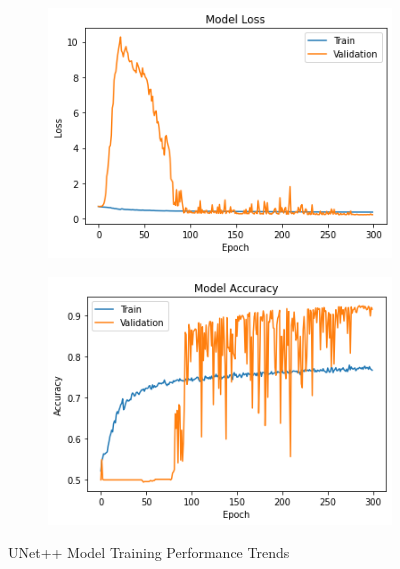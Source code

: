 \vspace{-\parskip}
\begin{figure}[H]
        \begin{subfigure}[b]{0.5\textwidth}
                \includegraphics[width=\linewidth]{Images/UNet++Accuracy.png}
        \end{subfigure}%
        \begin{subfigure}[b]{0.5\textwidth}
                \includegraphics[width=\linewidth]{Images/UNet++Loss.png}
        \end{subfigure}%
        \caption{UNet++ Model Training Performance Trends}\label{fig:unet++ModelTraining}
\end{figure}

